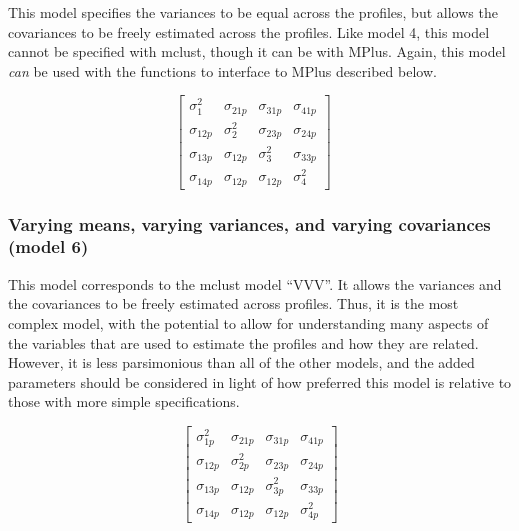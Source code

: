 \documentclass[]{book}
\theoremstyle{definition}
\theoremstyle{definition}
\theoremstyle{definition}
\theoremstyle{remark}
\begin{document}
This model specifies the variances to be equal across the profiles, but
allows the covariances to be freely estimated across the profiles. Like
model 4, this model cannot be specified with mclust, though it can be
with MPlus. Again, this model \emph{can} be used with the functions to
interface to MPlus described below.

\[
\left[ \begin{matrix} { \sigma  }_{ 1 }^{ 2 } & { \sigma  }_{ 21p } & { \sigma  }_{ 31p } & { \sigma  }_{ 41p } \\ { \sigma  }_{ 12p } & { \sigma  }_{ 2 }^{ 2 } & { \sigma  }_{ 23p } & { \sigma  }_{ 24p } \\ { \sigma  }_{ 13p } & { \sigma  }_{ 12p } & { \sigma  }_{ 3 }^{ 2 } & { \sigma  }_{ 33p } \\ { \sigma  }_{ 14p } & { \sigma  }_{ 12p } & { \sigma  }_{ 12p } & { \sigma  }_{ 4 }^{ 2 } \end{matrix} \right] \quad 
\]

\subsubsection{Varying means, varying variances, and varying covariances
(model
6)}\label{varying-means-varying-variances-and-varying-covariances-model-6}

This model corresponds to the mclust model ``VVV''. It allows the
variances and the covariances to be freely estimated across profiles.
Thus, it is the most complex model, with the potential to allow for
understanding many aspects of the variables that are used to estimate
the profiles and how they are related. However, it is less parsimonious
than all of the other models, and the added parameters should be
considered in light of how preferred this model is relative to those
with more simple specifications.

\[
\left[ \begin{matrix} { \sigma  }_{ 1p }^{ 2 } & { \sigma  }_{ 21p } & { \sigma  }_{ 31p } & { \sigma  }_{ 41p } \\ { \sigma  }_{ 12p } & { \sigma  }_{ 2p }^{ 2 } & { \sigma  }_{ 23p } & { \sigma  }_{ 24p } \\ { \sigma  }_{ 13p } & { \sigma  }_{ 12p } & { \sigma  }_{ 3p }^{ 2 } & { \sigma  }_{ 33p } \\ { \sigma  }_{ 14p } & { \sigma  }_{ 12p } & { \sigma  }_{ 12p } & { \sigma  }_{ 4p }^{ 2 } \end{matrix} \right] 
\]
\end{document}
